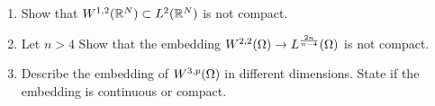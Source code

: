 \begin{enumerate}
\item Show that $W^{1, 2}(\mathbb{R}^N) \subset L^2(\mathbb{R}^N)$ is not compact.

\item Let $n > 4$
  Show that the embedding $W^{2, 2}(\Omega) \rightarrow L^{\frac{2 n}{n - 4}}(\Omega)$ is not compact.

\item Describe the embedding of $W^{3, p}(\Omega)$ in different dimensions.
  State if the embedding is continuous or compact.

\end{enumerate}
